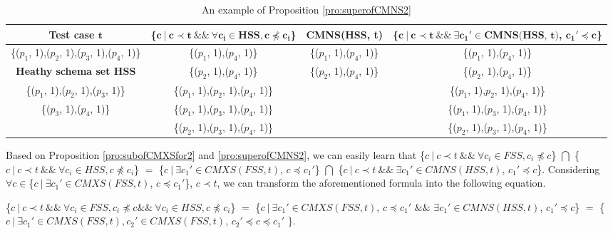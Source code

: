 {\begin{table}[ht]
  \centering
  \setlength{\tabcolsep}{2pt}
  \caption{An example of Proposition \ref{pro:superofCMNS2}}
    \begin{tabular}{|c|c|c|c|}
    \hline
  \textbf{  Test case $\textbf{t}$} & \textbf{ \{$\textbf{c}\ |\ \textbf{c} \prec \textbf{t}\ \&\&\ \forall \textbf{c}_{\textbf{i}} \in \textbf{HSS}, \textbf{c} \npreceq \textbf{c}_{\textbf{i}} $\} }& \textbf{  CMNS(HSS, t)} & \textbf{\{$ \textbf{c}\ |\ \textbf{c} \prec \textbf{t} \ \&\& \ \exists \textbf{c}_{\textbf{1}}' \in \textbf{CMNS(HSS, t)}$, $\textbf{c}_{\textbf{1}}' \preceq \textbf{c}$\}}\\\hline
    \{($p_{1}$, 1),($p_{2}$, 1),($p_{3}$, 1),($p_{4}$, 1)\}  & \{($p_{1}$, 1),($p_{4}$, 1)\} & \{($p_{1}$, 1),($p_{4}$, 1)\} & \{($p_{1}$, 1),($p_{4}$, 1)\}\\ \cline{1-1}
      \textbf{Heathy schema set HSS}  & \{($p_{2}$, 1),($p_{4}$, 1)\} & \{($p_{2}$, 1),($p_{4}$, 1)\} & \{($p_{2}$, 1),($p_{4}$, 1)\} \\\cline{1-1}
     \{($p_{1}$, 1),($p_{2}$, 1),($p_{3}$, 1)\}         &\{($p_{1}$, 1),($p_{2}$, 1),($p_{4}$, 1)\}  &  &  \{($p_{1}$, 1),$p_{2}$, 1),($p_{4}$, 1)\}   \\
     \{($p_{3}$, 1),($p_{4}$, 1)\}         &\{($p_{1}$, 1),($p_{3}$, 1),($p_{4}$, 1)\}    &  &  \{($p_{1}$, 1),($p_{3}$, 1),($p_{4}$, 1)\}  \\
                         &\{($p_{2}$, 1),($p_{3}$, 1),($p_{4}$, 1)\}   &  & \{($p_{2}$, 1),($p_{3}$, 1),($p_{4}$, 1)\}   \\ \hline
    \end{tabular}%
  \label{examleOfCMNSPro2}%
\end{table}%


Based on Proposition \ref{pro:subofCMXSfor2} and \ref{pro:superofCMNS2}, we can easily learn that \{$c\ |\ c \prec t\ \&\&\ \forall c_{i} \in FSS, c_{i} \npreceq c $\} $\bigcap$ \{$c\ |\ c \prec t\ \&\&\ \forall c_{i} \in HSS, c \npreceq c_{i} $\}  $=$  \{$ c\ |\ \exists c_{1}' \in CMXS(FSS, t)$, $c \preceq c_{1}'$\} $\bigcap$  \{$ c\ |\ c \prec t \ \&\& \ \exists c_{1}' \in CMNS(HSS, t)$, $c_{1}' \preceq c$\}. Considering $\forall c \in $\{$ c\ |\ \exists c_{1}' \in CMXS(FSS, t)$, $c \preceq c_{1}'$\}, $c \prec t$, we can transform the aforementioned formula into the following equation.

\{$c\ |\ c \prec t\ \&\&\ \forall c_{i} \in FSS, c _{i} \npreceq c \&\&\ \forall c_{i} \in HSS, c \npreceq c_{i}  $\} $=$  \{$ c\ |\ \exists c_{1}' \in CMXS(FSS, t)$, $c \preceq c_{1}'$ $\&\&$ $\exists c_{1}' \in CMNS(HSS, t)$, $c_{1}' \preceq c$\} $=$  \{$ c\ |\ \exists c_{1}' \in CMXS(FSS, t), c_{2}' \in CMXS(FSS, t)$, $c_{2}' \preceq c \preceq c_{1}'$ \}.

}
